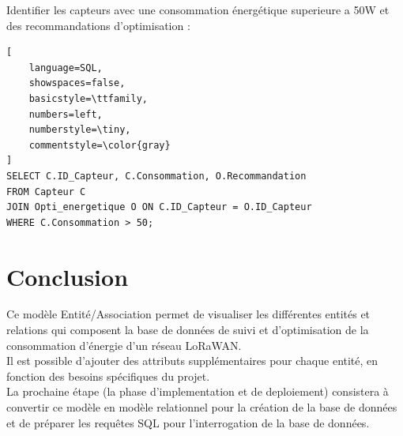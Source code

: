 \documentclass[
	a4paper, %
	11pt, %
	unnumberedsections, %
	twoside, %
    xcolor = {dvipsnames}
]{class}
\begin{document}
\noindent
Identifier les capteurs avec une consommation énergétique superieure a 50W et des recommandations d'optimisation :
\begin{lstlisting}[
    language=SQL,
    showspaces=false,
    basicstyle=\ttfamily,
    numbers=left,
    numberstyle=\tiny,
    commentstyle=\color{gray}
]
SELECT C.ID_Capteur, C.Consommation, O.Recommandation
FROM Capteur C
JOIN Opti_energetique O ON C.ID_Capteur = O.ID_Capteur
WHERE C.Consommation > 50;
\end{lstlisting}

\section{Conclusion}
Ce modèle Entité/Association permet de visualiser les différentes entités et relations qui composent la base de données de suivi et d'optimisation de la consommation d'énergie d'un réseau LoRaWAN.\\
Il est possible d'ajouter des attributs supplémentaires pour chaque entité, en fonction des besoins spécifiques du projet.\\
La prochaine étape (la phase d'implementation et de deploiement) consistera à convertir ce modèle en modèle relationnel pour la création de la base de données et de pr\'eparer les requêtes SQL pour l'interrogation de la base de données.\par
\end{document}
